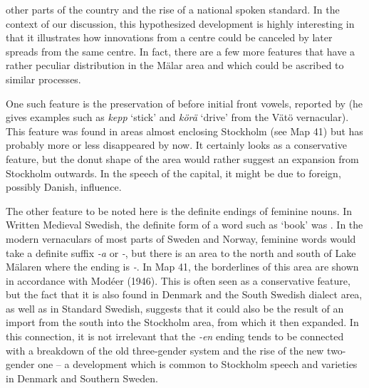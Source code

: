 other parts of the country and the rise of a national spoken standard. In the context of our discussion, this hypothesized development is highly interesting in that it illustrates how innovations from a centre could be canceled by later spreads from the same centre. In fact, there are a few more features that have a rather peculiar distribution in the Mälar area and which could be ascribed to similar processes. 


One such feature is the preservation of  before initial front vowels, reported by \citet{Kruuse1908} (he gives examples such as \textit{kepp} ‘stick’ and \textit{körä} ‘drive’ from the Vätö vernacular). This feature was found in areas almost enclosing Stockholm (see Map 41) but has probably more or less disappeared by now. It certainly looks as a conservative feature, but the donut shape of the area would rather suggest an expansion from Stockholm outwards. In the speech of the capital, it might be due to foreign, possibly Danish, influence.


The other feature to be noted here is the definite endings of feminine nouns. In Written Medieval Swedish, the definite form of a word such as  ‘book’ was . In the modern vernaculars of most parts of Sweden and Norway, feminine words would take a definite suffix\textit{ {}-a} or\textit{ {}-}, but there is an area to the north and south of Lake Mälaren where the ending is\textit{ {}-}. In Map 41, the borderlines of this area are shown in accordance with Modéer (1946). This is often seen as a conservative feature, but the fact that it is also found in Denmark and the South Swedish dialect area, as well as in Standard Swedish, suggests that it could also be the result of an import from the south into the Stockholm area, from which it then expanded. In this connection, it is not irrelevant that the \textit{{}-en} ending tends to be connected with a breakdown of the old three-gender system and the rise of the new two-gender one – a development which is common to Stockholm speech and varieties in Denmark and Southern Sweden.

